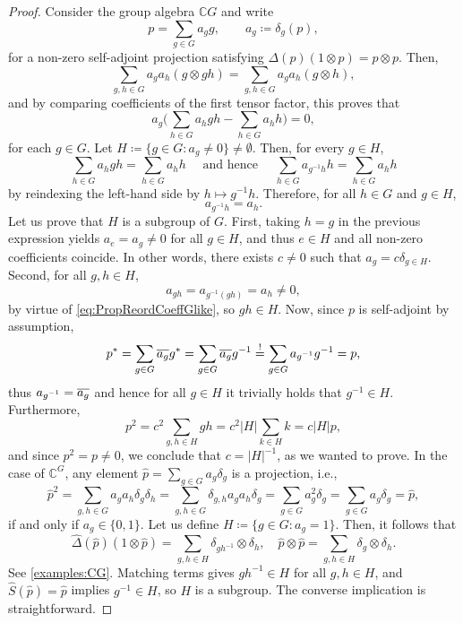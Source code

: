 \documentclass[a4paper,10pt]{amsart}
\theoremstyle{definition}
\begin{document}
\begin{proof}
Consider the group algebra $\mathbb{C}G$ and write
\[
    p = \sum_{g\in G} a_g g, \qquad a_g  \coloneqq  \delta_g(p),
\]
for a non-zero self-adjoint projection satisfying $\Delta(p)(1\otimes p) = p\otimes p$. Then,
\[
    \sum_{g,h\in G} a_g a_h (g \otimes gh)
    =
    \sum_{g,h\in G} a_g a_h (g \otimes h),
\]
and by comparing coefficients of the first tensor factor, this proves that
\[
    a_g \big( \sum_{h\in G} a_h gh - \sum_{h\in G} a_h h \big)=0,
\]
for each $g\in G$. Let $H  \coloneqq  \{ g\in G : a_g \neq 0 \} \neq \emptyset$.
Then, for every $g\in H$,
\[
    \sum_{h\in G} a_h gh = \sum_{h\in G} a_h h
    \quad\text{ and hence }\quad
    \sum_{h\in G} a_{g^{-1}h} h = \sum_{h\in G} a_h h
\]
by reindexing the left-hand side by $h \mapsto g^{-1}h$. Therefore,
for all $h\in G$ and $g\in H$,
\begin{equation}
\label{eq:PropReordCoeffGlike}
    a_{g^{-1}h} = a_h.
\end{equation}
Let us prove that $H$ is a subgroup of $G$.
First, taking $h = g$ in the previous expression yields $a_e = a_g \neq 0$ for all $g\in H$, and thus $e\in H$ and all non-zero coefficients coincide.
In other words, there exists $c\neq 0$ such that $a_g = c \delta_{g\in H}$.
Second, for all $g,h\in H$,
\[
    a_{gh}
    =
    a_{g^{-1}(gh)}
    =
    a_h
    \neq 0,
\]
by virtue of \cref{eq:PropReordCoeffGlike}, so $gh \in H$.
Now, since $p$ is self-adjoint by assumption,
\[
    p^*
    =
    \sum_{g\in G} \overline{a_g} g^*
    = 
    \sum_{g\in G} \overline{a_g} g^{-1}
    \overset{!}=
    \sum_{g\in G} a_{\smash{g^{-1}}} g^{-1}
    =
    p,
\]
thus $a_{\smash{g^{-1}}} = \overline{a_g}$ and
hence for all $g\in H$ it trivially holds that $g^{-1}\in H$.
Furthermore,
\[
    p^2
    =
    c^2 \sum_{g,h\in H} gh
    =
    c^2 |H| \sum_{k\in H} k
    =
    c|H| p,
\]
and since $p^2=p\neq 0$, we conclude that $c=|H|^{-1}$, as we wanted to prove.
\smallbreak\noindent%
In the case of $\mathbb{C}^G$,
any element $\hat{p} = \sum_{g \in G} a_g \delta_g $ is a projection, i.e.,
\[
    \hat{p}^2
    =
    \sum_{g,h\in G} a_g a_h \delta_g\delta_h
    =
    \sum_{g,h\in G} \delta_{g,h} a_g a_h \delta_{g}
    =
    \sum_{g\in G} a_g^2 \delta_{g}
    =
    \sum_{g\in G} a_g \delta_{g}
    =
    \hat{p},
\]
if and only if $a_g \in \{0, 1\} $.
Let us define $ H  \coloneqq  \{ g \in G : a_g = 1 \} $.
Then, it follows that
\[
	\hat\Delta(\hat{p})(1 \otimes \hat{p})
    =
    \sum_{g, h \in H} \delta_{g h^{-1}} \otimes \delta_h,
    \quad
    \hat{p} \otimes \hat{p}
    =
    \sum_{g, h \in H} \delta_g \otimes \delta_h.
\]
See \cref{examples:CG}.
Matching terms gives $ gh^{-1} \in H $ for all $ g, h \in H $,
and $\hat{S}(\hat{p}) = \hat{p} $ implies $ g^{-1} \in H $,
so $ H $ is a subgroup.
\smallbreak\noindent%
The converse implication is straightforward.
\end{proof}
\end{document}
